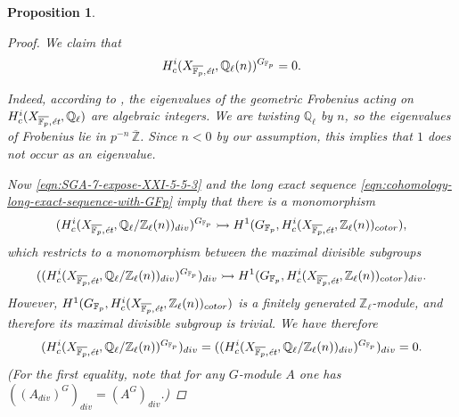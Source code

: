 \documentclass{article}
\newcommand{\FF}{\mathbb{F}}
\newcommand{\QQ}{\mathbb{Q}}
\newcommand{\ZZ}{\mathbb{Z}}
\newtheorem{proposition}[theorem]{Proposition}
\theoremstyle{definition}
\numberwithin{equation}{section}
\begin{document}
\begin{proposition}
\begin{proof}
    We claim that
    \begin{equation}
      \label{eqn:SGA-7-expose-XXI-5-5-3}
      H^i_c (X_{\overline{\FF_p},\text{\it ét}}, \QQ_\ell (n))^{G_{\FF_p}} = 0.
    \end{equation}

    Indeed, according to \cite[Exposé~XXI, 5.5.3]{SGA7}, the eigenvalues of the
    geometric Frobenius acting on
    $H^i_c (X_{\overline{\FF_p},\text{\it ét}}, \QQ_\ell)$ are algebraic
    integers. We are twisting $\QQ_\ell$ by $n$, so the eigenvalues of Frobenius
    lie in $p^{-n}\,\overline{\ZZ}$. Since $n < 0$ by our assumption, this
    implies that $1$ does not occur as an eigenvalue.

    Now \eqref{eqn:SGA-7-expose-XXI-5-5-3} and the long exact sequence
    \eqref{eqn:cohomology-long-exact-sequence-with-GFp} imply that there is a
    monomorphism
    \[ (H^i_c (X_{\overline{\FF_p},\text{\it ét}}, \QQ_\ell/\ZZ_\ell (n))_{div})^{G_{\FF_p}} \rightarrowtail
    H^1 (G_{\FF_p}, H^i_c (X_{\overline{\FF_p},\text{\it ét}}, \ZZ_\ell (n))_{cotor}), \]
    which restricts to a monomorphism between the maximal divisible subgroups
    \[ ((H^i_c (X_{\overline{\FF_p},\text{\it ét}}, \QQ_\ell/\ZZ_\ell (n))_{div})^{G_{\FF_p}})_{div} \rightarrowtail
    H^1 (G_{\FF_p}, H^i_c (X_{\overline{\FF_p},\text{\it ét}}, \ZZ_\ell (n))_{cotor})_{div}. \]
    However,
    $H^1 (G_{\FF_p}, H^i_c (X_{\overline{\FF_p},\text{\it ét}}, \ZZ_\ell (n))_{cotor})$
    is a finitely generated $\ZZ_\ell$-module, and therefore its
    maximal divisible subgroup is trivial. We have therefore
    \[ (H^i_c (X_{\overline{\FF_p},\text{\it ét}}, \QQ_\ell/\ZZ_\ell (n))^{G_{\FF_p}})_{div} =
    ((H^i_c (X_{\overline{\FF_p},\text{\it ét}}, \QQ_\ell/\ZZ_\ell (n))_{div})^{G_{\FF_p}})_{div} = 0. \]
    (For the first equality, note that for any $G$-module $A$ one has
    $((A_{div})^G)_{div} = (A^G)_{div}$.)
  \end{proof}
\end{proposition}
\end{document}
